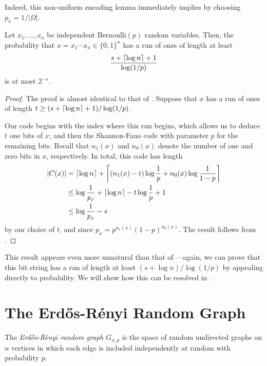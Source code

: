 Indeed, this non-uniform encoding lemma immediately implies
 by choosing $p_x = 1/|\Omega|$.

\begin{prop}
  Let $x_1, \ldots, x_n$ be independent $\text{Bernoulli}(p)$ random
  variables. Then, the probability that $x = x_1 \cdots x_n \in \{0,
  1\}^n$ has a run of ones of length at least
  \[\frac{s + {\lceil \log n \rceil} + 1}{\log (1/p)}\]
  is at most $2^{-s}$.
\end{prop}
\begin{proof}
  The proof is almost identical to that of
  . Suppose that $x$ has a run of ones of length
  $t \geq (s + {\lceil \log n \rceil} + 1)/\log (1/p)$.

  Our code begins with the index where this run begins, which allows
  us to deduce $t$ one bits of $x$; and then the Shannon-Fano code
  with parameter $p$ for the remaining bits. Recall that $n_1(x)$ and
  $n_0(x)$ denote the number of one and zero bits in $x$,
  respectively. In total, this code has length
  \begin{align*}
    |C(x)| &= \ceil{\log n} + \left\lceil (n_1(x) - t) \log \frac{1}{p} + n_0(x) \log \frac{1}{1 - p} \right\rceil \\
           &\leq \log \frac{1}{p_x} + \ceil{\log n} - t \log \frac{1}{p} + 1 \\
           &\leq \log \frac{1}{p_x} - s
  \end{align*}
  by our choice of $t$, and since $p_x = p^{n_1(x)} (1 -
  p)^{n_0(x)}$. The result follows from .
\end{proof}

This result appears even more unnatural than that of
---again, we can prove that this bit string has a
run of length at least $(s + \log n)/\log (1/p)$ by appealing directly
to probability. We will show how this can be resolved in .

\section{The Erd\H{o}s-R\'{e}nyi Random Graph}

\begin{defn}
  The \emph{Erd\H{o}s-R\'{e}nyi random graph} $G_{n, p}$ is the space
  of random undirected graphs on $n$ vertices in which each edge is
  included independently at random with probability $p$.
\end{defn}

